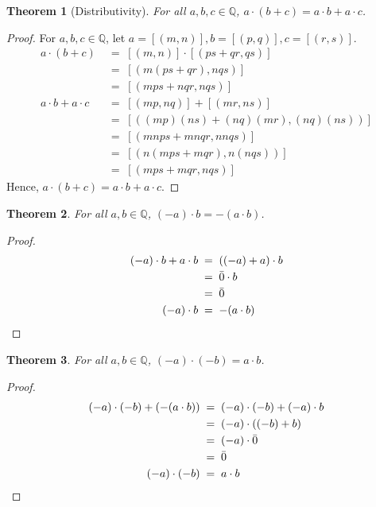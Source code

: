 \documentclass[10pt]{article}
\newtheorem{theorem}{Theorem}[section]
\theoremstyle{definition}
\theoremstyle{remark}
\newcommand{\Q}{\mathbb{Q}}
\begin{document}
        \begin{theorem}[Distributivity]
                For all $a,b,c \in \Q$, $a\cdot(b + c) = a\cdot b + a\cdot c$.
        \end{theorem}
        \begin{proof}
                For $a,b,c \in \Q$, let $a = [(m, n)], b = [(p, q)], c = [(r, s)]$.
                \begin{align*}
                        a\cdot (b + c) \;&=\; [(m, n)] \cdot [(ps + qr, qs)] \\
                                \;&=\; [(m(ps + qr), nqs)] \\
                                \;&=\; [(mps + nqr, nqs)] \\
                        a\cdot b + a\cdot c \;&=\; [(mp, nq)] + [(mr, ns)] \\
                                \;&=\; [((mp)(ns) + (nq)(mr), (nq)(ns))] \\
                                \;&=\; [(mnps + mnqr, nnqs)] \\
                                \;&=\; [(n(mps + mqr), n(nqs))] \\
                                \;&=\; [(mps + mqr, nqs)]
                \end{align*}
                Hence, $a\cdot (b + c) = a\cdot b + a\cdot c$.
        \end{proof}
        \begin{theorem}
                For all $a, b \in \Q$, $(-a)\cdot b = -(a\cdot b)$.
        \end{theorem}
        \begin{proof}
                \begin{align*}
                        (-a)\cdot b + a\cdot b \;&=\; ((-a) + a)\cdot b \\
                                \;&=\; \bar{0} \cdot b \\
                                \;&=\; \bar{0}\\
                        (-a)\cdot b \;&=\; -(a\cdot b) \qedhere
                \end{align*}
        \end{proof}
        \begin{theorem}
                For all $a, b \in \Q$, $(-a)\cdot(-b) = a\cdot b$.
        \end{theorem}
        \begin{proof}
                \begin{align*}
                        (-a)\cdot(-b) + (-(a\cdot b)) \;&=\; (-a)\cdot(-b) + (-a)\cdot b\\
                                \;&=\; (-a)\cdot((-b) + b) \\
                                \;&=\; (-a)\cdot \bar{0} \\
                                \;&=\; \bar{0}\\
                        (-a)\cdot(-b) \;&=\; a\cdot b \qedhere
                \end{align*}
        \end{proof}
\end{document}
